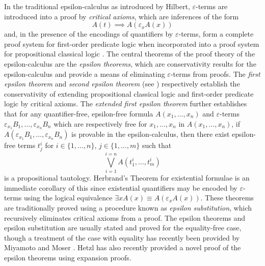 \documentclass[10pt]{article}
\theoremstyle{definition}\newtheorem{remark}[theorem]{Remark}
\theoremstyle{definition}\newtheorem{example}[theorem]{Example}
\theoremstyle{definition}\newtheorem{definition}[theorem]{Definition}
\begin{document}
	In the traditional epsilon-calculus as introduced by Hilbert, $\varepsilon$-terms are introduced into a proof by \textit{critical axioms}, which are inferences of the form
	\[
		A(t) \implies A(\varepsilon_x A(x))
	\]
	and, in the presence of the encodings of quantifiers by $\varepsilon$-terms, form a complete proof system for first-order predicate logic when incorporated into a proof system for propositional classical logic \cite{ZachEpsilonSemantics}. The central theorems of the proof theory of the epsilon-calculus are the \textit{epsilon theorems}, which are conservativity results for the epsilon-calculus and provide a means of eliminating $\varepsilon$-terms from proofs. The \textit{first epsilon theorem} and \textit{second epsilon theorem} (see \cite{MoserZachEpsilonCalculusAndHerbrand}) respectively establish the conservativity of extending propositional classical logic and first-order predicate logic by critical axioms. The \textit{extended first epsilon theorem} \cite{BaazEpsilon, MoserZachEpsilonCalculusAndHerbrand} further establishes that for any quantifier-free, epsilon-free formula $A(x_1, \dots, x_n)$ and $\varepsilon$-terms $\varepsilon_{x_1} B_1, \dots, \varepsilon_{x_n} B_n$ which are respectively free for $x_1, \dots, x_n$ in $A(x_1, \dots, x_n)$, if $A(\varepsilon_{x_1} B_1, \dots, \varepsilon_{x_n} B_n)$ is provable in the epsilon-calculus, then there exist epsilon-free terms $t_j^i$ for $i \in \{1, \dots, n\}$, $j \in \{1, \dots, m\}$ such that
	\[
		\bigvee\limits_{i = 1}^{i=n} A(t_1^i, \dots, t_m^i)
	\]
	is a propositional tautology. Herbrand's Theorem for existential formulae is an immediate corollary of this since existential quantifiers may be encoded by $\varepsilon$-terms using the logical equivalence $\exists x A(x) \equiv A(\varepsilon_x A(x))$. These theorems are traditionally proved using a procedure known as \textit{epsilon substitution}, which recursively eliminates critical axioms from a proof. The epsilon theorems and epsilon substitution are usually stated and proved for the equality-free case, though a treatment of the case with equality has recently been provided by Miyamoto and Moser \cite{MiyamotoMoserEpsilonEquality}. Hetzl \cite{HetzlEpsilonTheorems} has also recently provided a novel proof of the epsilon theorems using expansion proofs.
	
\end{document}
